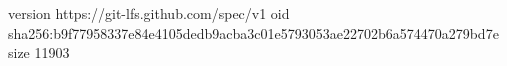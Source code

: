 version https://git-lfs.github.com/spec/v1
oid sha256:b9f77958337e84e4105dedb9acba3c01e5793053ae22702b6a574470a279bd7e
size 11903
